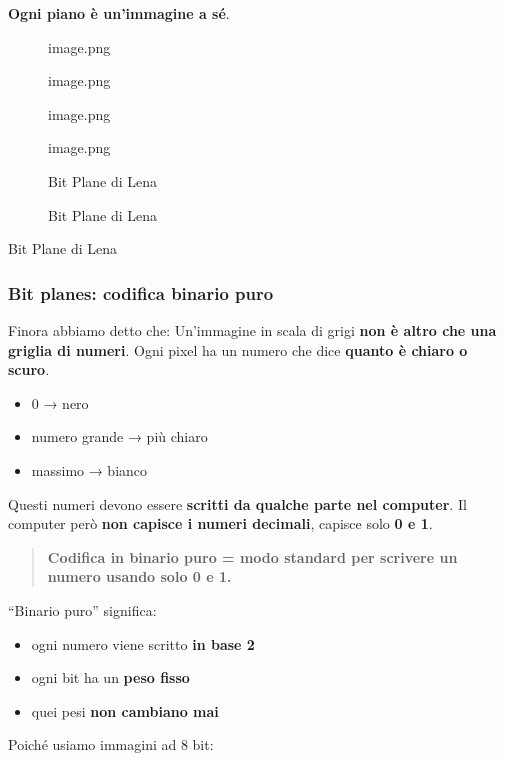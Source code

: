 \documentclass[
]{article}
\providecommand{\tightlist}{%
  \setlength{\itemsep}{0pt}\setlength{\parskip}{0pt}}
\begin{document}
\textbf{Ogni piano è un'immagine a sé}.

\begin{figure}
\centering
{image.png}
\caption{image.png}
\end{figure}

\begin{figure}
\centering
{image.png}
\caption{image.png}
\end{figure}

\begin{figure}
\centering
{Bit Plane di Lena}
\caption{Bit Plane di Lena}
\end{figure}

Bit Plane di Lena

\hypertarget{bit-planes-codifica-binario-puro}{%
\subsubsection{Bit planes: codifica binario puro}\label{bit-planes-codifica-binario-puro}}

Finora abbiamo detto che:
Un'immagine in scala di grigi \textbf{non è altro che una griglia di numeri}.
Ogni pixel ha un numero che dice \textbf{quanto è chiaro o scuro}.

\begin{itemize}
\tightlist
\item
  0 → nero
\item
  numero grande → più chiaro
\item
  massimo → bianco
\end{itemize}

Questi numeri devono essere \textbf{scritti da qualche parte nel computer}. Il computer però \textbf{non capisce i numeri decimali}, capisce solo \textbf{0 e 1}.

\begin{quote}
\textbf{Codifica in binario puro = modo standard per scrivere un numero usando solo 0 e 1.}
\end{quote}

``Binario puro'' significa:

\begin{itemize}
\tightlist
\item
  ogni numero viene scritto \textbf{in base 2}
\item
  ogni bit ha un \textbf{peso fisso}
\item
  quei pesi \textbf{non cambiano mai}
\end{itemize}

Poiché usiamo immagini ad 8 bit:
\end{document}
